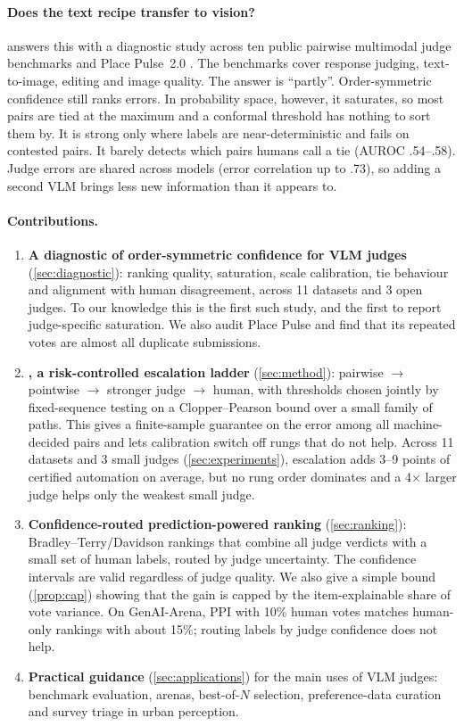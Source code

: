 \paragraph{Does the text recipe transfer to vision?}
 answers this with a diagnostic study across ten public pairwise multimodal judge benchmarks and Place Pulse~2.0 \citep{dubey2016deep}. The benchmarks cover response judging, text-to-image, editing and image quality.
The answer is ``partly''.
Order-symmetric confidence still ranks errors. In probability space, however, it saturates, so most pairs are tied at the maximum and a conformal threshold has nothing to sort them by.
It is strong only where labels are near-deterministic and fails on contested pairs. It barely detects which pairs humans call a tie (AUROC .54--.58).
Judge errors are shared across models (error correlation up to .73), so adding a second VLM brings less new information than it appears to.

\paragraph{Contributions.}
\begin{enumerate}[leftmargin=*,itemsep=2pt]
  \item \textbf{A diagnostic of order-symmetric confidence for VLM judges} (\cref{sec:diagnostic}): ranking quality, saturation, scale calibration, tie behaviour and alignment with human disagreement, across 11 datasets and 3 open judges. To our knowledge this is the first such study, and the first to report judge-specific saturation. We also audit Place Pulse and find that its repeated votes are almost all duplicate submissions.
  \item \textbf{\eaglev{}, a risk-controlled escalation ladder} (\cref{sec:method}): pairwise $\rightarrow$ pointwise $\rightarrow$ stronger judge $\rightarrow$ human, with thresholds chosen jointly by fixed-sequence testing on a Clopper--Pearson bound over a small family of paths. This gives a finite-sample guarantee on the error among all machine-decided pairs and lets calibration switch off rungs that do not help. Across 11 datasets and 3 small judges (\cref{sec:experiments}), escalation adds 3--9 points of certified automation on average, but no rung order dominates and a 4$\times$ larger judge helps only the weakest small judge.
  \item \textbf{Confidence-routed prediction-powered ranking} (\cref{sec:ranking}): Bradley--Terry/Davidson rankings that combine all judge verdicts with a small set of human labels, routed by judge uncertainty. The confidence intervals are valid regardless of judge quality. We also give a simple bound (\cref{prop:cap}) showing that the gain is capped by the item-explainable share of vote variance. On GenAI-Arena, PPI with 10\% human votes matches human-only rankings with about 15\%; routing labels by judge confidence does not help.
  \item \textbf{Practical guidance} (\cref{sec:applications}) for the main uses of VLM judges: benchmark evaluation, arenas, best-of-$N$ selection, preference-data curation and survey triage in urban perception.
\end{enumerate}
